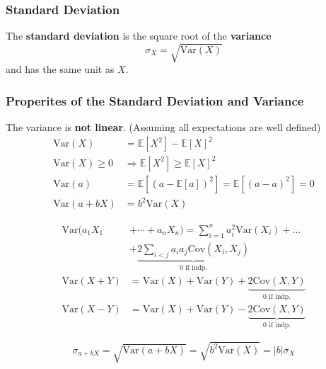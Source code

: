\subsubsection{Standard Deviation}
The \textbf{standard deviation} is the square root of the \textbf{variance}
\noindent\begin{equation*}
    \sigma_{X}=\sqrt{\mathrm{Var}(X)}
\end{equation*}
and has the same unit as $X$.

\subsubsection{Properites of the Standard Deviation and Variance}
The variance is \textbf{not linear}. (Assuming all expectations are well defined)
\noindent\begin{align*}
    \mathrm{Var}(X)      & = \mathbb{E}[X^2]-{\mathbb{E}[X]}^2                        \\
    \mathrm{Var}(X)\geq0 & \Rightarrow\mathbb{E}[X^{2}]\geq{\mathbb{E}[X]}^{2}        \\
    \mathrm{Var}(a)      & =\mathbb{E}[{(a-\mathbb{E}[a])}^2]=\mathbb{E}[{(a-a)}^2]=0 \\
    \mathrm{Var}(a+bX)   & = b^2\mathrm{Var}(X)
\end{align*}

\noindent\begin{align*}
    \mathrm{Var}(a_1X_1 & +\cdots+a_n X_n)  =\sum_{i=1}^{n}a_{i}^{2}\mathrm{Var}(X_{i})+\ldots                  \\
                        & + \underbrace{2\sum_{i<j}a_{i}a_{j}\mathrm{Cov}(X_{i},X_{j})}_{0\text{ if indp.}}     \\
    \mathrm{Var}(X+Y)   & =\mathrm{Var}(X)+\mathrm{Var}(Y)+ \underbrace{2\mathrm{Cov}(X,Y)}_{0\text{ if indp.}} \\
    \mathrm{Var}(X-Y)   & =\mathrm{Var}(X)+\mathrm{Var}(Y)-\underbrace{2\mathrm{Cov}(X,Y)}_{0\text{ if indp.}}
\end{align*}

\noindent\begin{equation*}
    \sigma_{a+bX}=\sqrt{\mathrm{Var}(a+bX)}=\sqrt{b^2\mathrm{Var}(X)}=|b|\sigma_X
\end{equation*}

